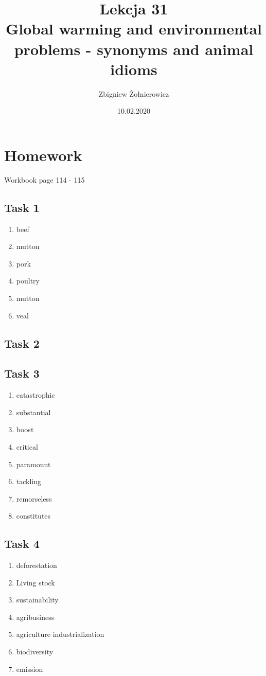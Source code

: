 \documentclass[a4paper]{article}
\begin{document}
\title{{\huge Lekcja 31} \\
{\large Global warming and environmental problems - synonyms and animal idioms}}
\author{Zbigniew Żołnierowicz}
\date{10.02.2020}
\maketitle
\section{Homework}
Workbook page 114 - 115
\subsection{Task 1}
\begin{enumerate}
	\item beef
	\item mutton
	\item pork
	\item poultry
	\item mutton
	\item veal
\end{enumerate}
\subsection{Task 2}
\subsection{Task 3}
\begin{enumerate}
	\item catastrophic
	\item substantial
	\item boost
	\item critical
	\item paramount
	\item tackling
	\item remorseless
	\item constitutes
\end{enumerate}
\subsection{Task 4}
\begin{enumerate}
	\item deforestation
	\item Living stock
	\item sustainability
	\item agribusiness
	\item agriculture industrialization
	\item biodiversity
	\item emission
\end{enumerate}
\end{document}
